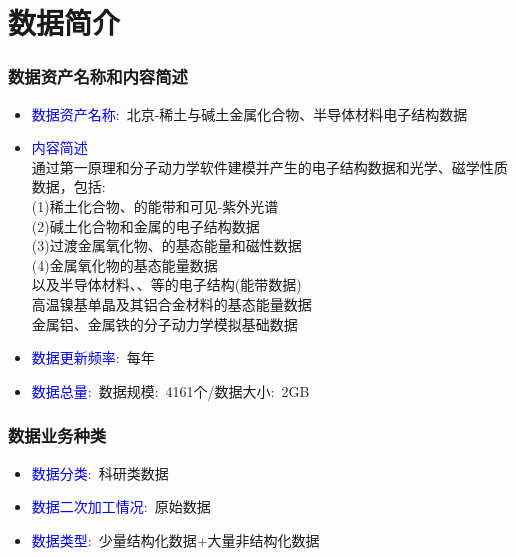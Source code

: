 \small
\section{数据简介}
\frame
{\frametitle{数据资产名称和内容简述}
\begin{itemize}
	\item \textcolor{blue}{数据资产名称:~}北京-稀土与碱土金属化合物、半导体材料电子结构数据
	\item \textcolor{blue}{内容简述}\\
		通过第一原理和分子动力学软件建模并产生的电子结构数据和光学、磁学性质数据，包括:\\
		(1)稀土化合物\textrm{}、\textrm{}的能带和可见-紫外光谱\\
		(2)碱土化合物\textrm{}和金属\textrm{}的电子结构数据\\
		(3)过渡金属氧化物\textrm{}、\textrm{}的基态能量和磁性数据\\
		(4)金属氧化物\textrm{}的基态能量数据\\
		以及半导体材料\textrm{}、\textrm{}、\textrm{}等的电子结构(能带数据)\\
		高温镍基单晶\textrm{}及其铝合金材料的基态能量数据\\
		金属铝、金属铁的分子动力学模拟基础数据
	\item \textcolor{blue}{数据更新频率:~}每年
	\item \textcolor{blue}{数据总量:~}数据规模:~4161个/数据大小:~2\textrm{GB}
\end{itemize}
}

\frame
{\frametitle{数据业务种类}
\begin{itemize}
   		\setlength{\itemsep}{15pt}
		\item \textcolor{blue}{数据分类:~}科研类数据
		\item \textcolor{blue}{数据二次加工情况:~}原始数据
		\item \textcolor{blue}{数据类型:~}少量结构化数据+大量非结构化数据
\end{itemize}
}

